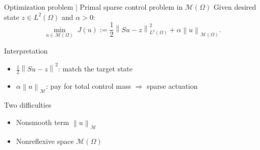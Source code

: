 \documentclass[aspectratio=169]{beamer}
\newcommand{\Om}{\Omega}
\newcommand{\M}{\mathcal{M}}
\newcommand{\norm}[1]{\left\lVert #1\right\rVert}
\begin{document}
\begin{frame}{Optimization problem | Primal sparse control problem in $\M(\Om)$}
Given desired state $z\in L^2(\Om)$ and $\alpha>0$:
\[
\min_{u\in \M(\Om)}\;
J(u):=\frac12 \norm{Su-z}_{L^2(\Om)}^2 + \alpha \norm{u}_{\M(\Om)}.
\]

\begin{block}{Interpretation}
\begin{itemize}
  \item $\frac12\norm{Su-z}^2$: match the target state
  \item $\alpha\norm{u}_{\M}$: pay for total control mass $\Rightarrow$ sparse actuation
\end{itemize}
\end{block}

\begin{alertblock}{Two difficulties}
\begin{itemize}
  \item Nonsmooth term $\norm{u}_\M$
  \item Nonreflexive space $\M(\Om)$
\end{itemize}
\end{alertblock}
\end{frame}


\end{document}
